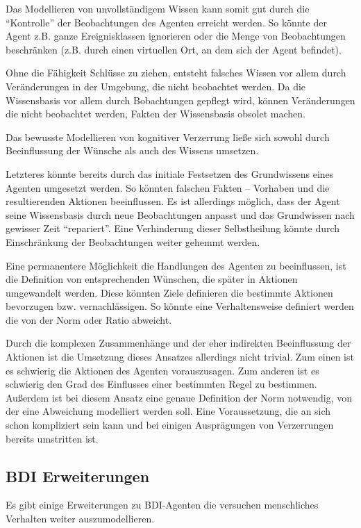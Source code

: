 Das Modellieren von unvollständigem Wissen kann somit gut durch die \enquote{Kontrolle} der Beobachtungen des Agenten erreicht werden. 
So könnte der Agent z.B. ganze Ereignisklassen ignorieren oder die Menge von Beobachtungen beschränken (z.B. durch einen virtuellen Ort, an dem sich der Agent befindet).

Ohne die Fähigkeit Schlüsse zu ziehen, entsteht falsches Wissen vor allem durch Veränderungen in der Umgebung, die nicht beobachtet werden.
Da die Wissensbasis vor allem durch Bobachtungen gepflegt wird, können Veränderungen die nicht beobachtet werden, Fakten der Wissensbasis obsolet machen.

Das bewusste Modellieren von kognitiver Verzerrung ließe sich sowohl durch Beeinflussung der Wünsche als auch des Wissens umsetzen. 

Letzteres könnte bereits durch das initiale Festsetzen des Grundwissens eines Agenten umgesetzt werden. 
So könnten falschen Fakten -- Vorhaben und die resultierenden Aktionen beeinflussen.
Es ist allerdings möglich, dass der Agent seine Wissensbasis durch neue Beobachtungen anpasst und das Grundwissen nach gewisser Zeit \enquote{repariert}.
Eine Verhinderung dieser Selbstheilung könnte durch Einschränkung der Beobachtungen weiter gehemmt werden.

Eine permanentere Möglichkeit die Handlungen des Agenten zu beeinflussen, ist die Definition von entsprechenden Wünschen, die später in Aktionen umgewandelt werden.
Diese könnten Ziele definieren die bestimmte Aktionen bevorzugen bzw. vernachlässigen.
So könnte eine Verhaltensweise definiert werden die von der Norm oder Ratio abweicht.

Durch die komplexen Zusammenhänge und der eher indirekten Beeinflussung der Aktionen ist die Umsetzung dieses Ansatzes allerdings nicht trivial.
Zum einen ist es schwierig die Aktionen des Agenten vorauszusagen.
Zum anderen ist es schwierig den Grad des Einflusses einer bestimmten Regel zu bestimmen.
Außerdem ist bei diesem Ansatz eine genaue Definition der Norm notwendig, von der eine Abweichung modelliert werden soll.
Eine Voraussetzung, die an sich schon kompliziert sein kann und bei einigen Ausprägungen von Verzerrungen bereits umstritten ist.

\subsection{BDI Erweiterungen}
Es gibt einige Erweiterungen zu BDI-Agenten die versuchen menschliches Verhalten weiter auszumodellieren.

